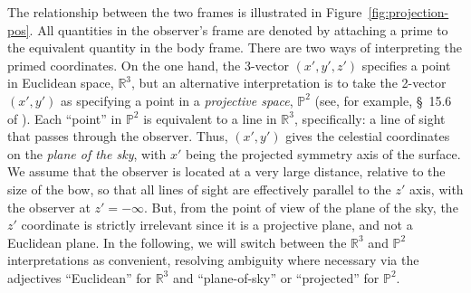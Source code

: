 The relationship between the two frames is illustrated in
Figure~\ref{fig:projection-pos}.  All quantities in the observer's
frame are denoted by attaching a prime to the equivalent quantity in
the body frame. There are two ways of interpreting the primed
coordinates. On the one hand, the 3-vector \((x', y', z')\) specifies
a point in Euclidean space, \(\mathds{R}^3\), but an alternative
interpretation is to take the 2-vector \((x', y')\) as specifying a
point in a \textit{projective space}, \(\mathds{P}^2\) (see, for
example, \S~15.6 of \citealp{Penrose:2004a}). Each ``point'' in
\(\mathds{P}^2\) is equivalent to a line in \(\mathds{R}^3\),
specifically: a line of sight that passes through the observer. Thus,
\((x', y')\) gives the celestial coordinates on the \textit{plane of
  the sky}, with \(x'\) being the projected symmetry axis of the
surface.  We assume that the observer is located at a very large
distance, relative to the size of the bow, so that all lines of sight
are effectively parallel to the \(z'\) axis, with the observer at
\(z' = -\infty\).  But, from the point of view of the plane of the sky, the
\(z'\) coordinate is strictly irrelevant since it is a projective
plane, and not a Euclidean plane.  In the following, we will switch
between the \(\mathds{R}^3\) and \(\mathds{P}^2\) interpretations as
convenient, resolving ambiguity where necessary via the adjectives
``Euclidean'' for \(\mathds{R}^3\) and ``plane-of-sky'' or
``projected'' for \(\mathds{P}^2\).



